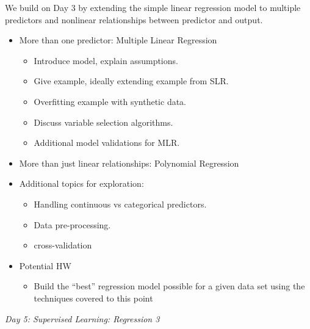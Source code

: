 \documentclass[12pt]{article}
\begin{document}
	\noindent
	We build on Day 3 by extending the simple linear regression model to multiple predictors and nonlinear relationships between predictor and output. 
	\begin{itemize}
		\item More than one predictor: Multiple Linear Regression
		\begin{itemize}
			\item Introduce model, explain assumptions.
			\item Give example, ideally extending example from SLR.
			\item Overfitting example with synthetic data.
			\item Discuss variable selection algorithms.
			\item Additional model validations for MLR.
		\end{itemize}
		\item More than just linear relationships: Polynomial Regression
		\item Additional topics for exploration:
		\begin{itemize}
			\item Handling continuous vs categorical predictors.
			\item Data pre-processing.
			\item cross-validation
		\end{itemize}
		\item Potential HW
		\begin{itemize}
			\item Build the ``best'' regression model possible for a given data set using the techniques covered to this point
		\end{itemize}
	\end{itemize}
	
	
	\vspace{2mm}
	\noindent
	\textit{\large{Day 5: Supervised Learning: Regression 3}}
	
\end{document}
